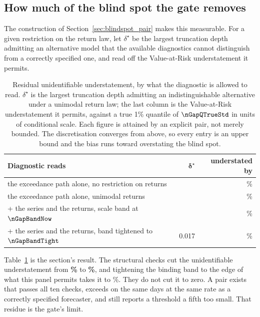 \subsection{How much of the blind spot the gate removes}
\label{sec:gate_residual}

The construction of Section~\ref{sec:blindspot_pair} makes this measurable. For
a given restriction on the return law, let $\delta^\star$ be the largest
truncation depth admitting an alternative model that the available diagnostics
cannot distinguish from a correctly specified one, and read off the
Value-at-Risk understatement it permits.

\begin{table}[htbp]
	\centering
	\caption{Residual unidentifiable understatement, by what the diagnostic is
		allowed to read. $\delta^\star$ is the largest truncation depth admitting
		an indistinguishable alternative under a unimodal return law; the last
		column is the Value-at-Risk understatement it permits, against a true 1\%
		quantile of $\nGapQTrueStd$ in units of conditional scale. Each figure is
		attained by an explicit pair, not merely bounded. The discretisation
		converges from above, so every entry is an upper bound and the bias runs
		toward overstating the blind spot.}
	\label{tab:gate_residual}
	\footnotesize
	\setlength{\tabcolsep}{5pt}
	\begin{tabular}{@{}>{\raggedright\arraybackslash}p{7.2cm}rr@{}}
		\toprule
		\textbf{Diagnostic reads} & $\bm{\delta^\star}$ & \textbf{understated by} \\
		\midrule
		the exceedance path alone, no restriction on returns & \nGapDeltaFree & \nGapUndFree\% \\
		the exceedance path alone, unimodal returns & \nGapDeltaUni & \nGapUndUni\% \\
		\addlinespace[2pt]
		\quad + the series and the returns, scale band at $\nGapBandNow$ & \nGapDeltaGateNow & \nGapUndGateNow\% \\
		\quad + the series and the returns, band tightened to $\nGapBandTight$ & 0.017 & \nGapUndTight\% \\
		\bottomrule
	\end{tabular}
\end{table}

Table~\ref{tab:gate_residual} is the section's result. The structural checks cut
the unidentifiable understatement from \textbf{\nGapUndUni\%} to
\textbf{\nGapUndGateNow\%}, and tightening the binding band to the edge of what
this panel permits takes it to \nGapUndTight\%. They do not cut it to zero. A pair exists that passes all ten checks, exceeds on the same
days at the same rate as a correctly specified forecaster, and still reports a
threshold a fifth too small. That residue is the gate's limit.

